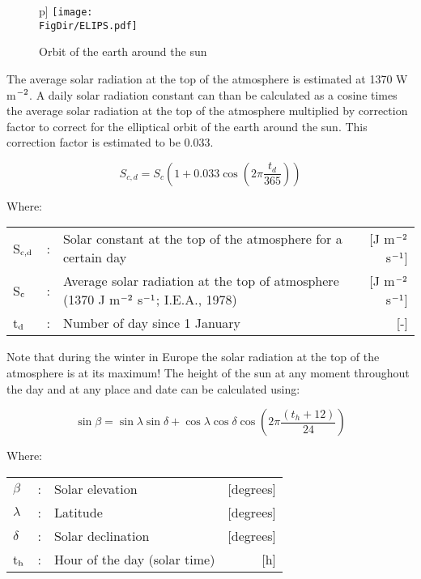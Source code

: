 \begin{figure}p]
	\centering
	\texttt{[image: \\FigDir/ELIPS.pdf]}
	\caption{Orbit of the earth around the sun}
	\label{fig:orbit}
\end{figure}

The average solar radiation at the top of the atmosphere is estimated at 1370 W m$^{\rm -2}$. A daily solar radiation constant can than be calculated as a cosine times the average solar radiation at the top of the atmosphere multiplied by correction factor to correct for the elliptical orbit of the earth around the sun. This correction factor is estimated to be 0.033.

\begin{equation}
\label{eq:SolarConst}
S _{c,d} = S _{c} (1+0.033 \cos (2 \pi {\frac{t _{d} }{365}} ))
\end{equation}

Where:\\[5pt]
\begin{tabularx}{\textwidth}{llXr}
	S$_{{\rm c,d}}$ &:& Solar constant at the top of the atmosphere for a certain day  & [J m$^{{\rm -2}}$ s$^{{\rm -1}}$]\\
	S$_{{\rm c}}$ &:& Average solar radiation at the top of atmosphere (1370 J m$^{{\rm -2}}$ s$^{{\rm -1}}$; I.E.A., 1978) & [J m$^{{\rm -2}}$ s$^{{\rm -1}}$]\\
	t$_{{\rm d}}$ &:& Number of day since 1 January  & [-]\\
\end{tabularx}

Note that during the winter in Europe the solar radiation at the top of the atmo\-sphere is at 
its maximum! The height of the sun at any moment throughout the day and at any place and date can be
calculated using:

\begin{equation}
\label{eq:SolarElevation}
\sin \beta = \sin \lambda \sin \delta + \cos \lambda \cos \delta \cos (2 \pi {\frac{(t _{h} +12)}{24}} )
\end{equation}

Where:\\[5pt]
\begin{tabularx}{\textwidth}{llXr}
	$\beta$ &:& Solar elevation  & [degrees]\\
	$\lambda$ &:& Latitude  & [degrees]\\
	$\delta$ &:& Solar declination  & [degrees]\\
	t$_{{\rm h}}$ &:& Hour of the day (solar time)  & [h]\\
\end{tabularx}


